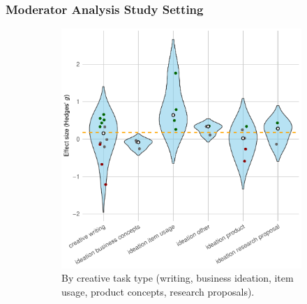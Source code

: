 \documentclass[manuscript, screen, review, acmsmall, anonymous]{acmart}
\begin{document}
\subsubsection{Moderator Analysis Study Setting}
\label{sec:CreativePerformance_Moderator_Study_Setting}
\begin{figure}[H]
  \centering
  \begin{subfigure}[t]{0.49\linewidth}
    \centering
    \includegraphics[width=\linewidth]{plot_performance_raw_violin_Task_Type}
    \caption{By creative task type (writing, business ideation, item usage, product concepts, research proposals).}
    \label{fig:performance_raw_violin_task_type}
  \end{subfigure}%
  \hfill
  \begin{subfigure}[t]{0.49\linewidth}
    \centering

\end{subfigure}
\end{figure}
\end{document}
